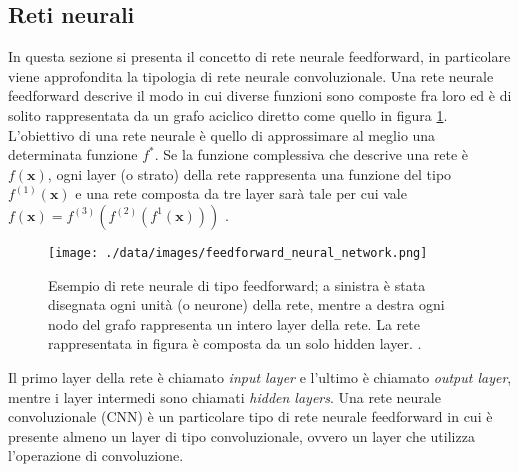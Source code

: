 \subsection{Reti neurali}
In questa sezione si presenta il concetto di rete neurale feedforward, in particolare viene approfondita la tipologia di rete neurale convoluzionale. 
Una rete neurale feedforward descrive il modo in cui diverse funzioni sono composte fra loro ed è di solito rappresentata da un grafo aciclico diretto come quello in figura \ref{feedforward}. L'obiettivo di una rete neurale è quello di approssimare al meglio una determinata funzione $f^{*}$. Se la funzione complessiva che descrive una rete è $f(\pmb{x})$, ogni layer (o strato) della rete rappresenta una funzione del tipo $f^{(1)}(\pmb{x})$ e una rete composta da tre layer sarà tale per cui vale $f(\pmb{x})=f^{(3)}(f^{(2)}(f^{1}(\pmb{x})))$ \cite{goodfellow2016deep}.
\begin{figure}
	\centering
	\texttt{[image: ./data/images/feedforward\_neural\_network.png]}
	\caption{Esempio di rete neurale di tipo feedforward; a sinistra è stata disegnata ogni unità (o neurone) della rete, mentre a destra ogni nodo del grafo rappresenta un intero layer della rete. La rete rappresentata in figura è composta da un solo hidden layer.  \cite{goodfellow2016deep}.}
	\label{feedforward}
\end{figure}
Il primo layer della rete è chiamato \textit{input layer} e l'ultimo è chiamato \textit{output layer}, mentre i layer intermedi sono chiamati \textit{hidden layers}. 
Una rete neurale convoluzionale (CNN) è un particolare tipo di rete neurale feedforward in cui è presente  almeno un layer di tipo convoluzionale, ovvero un layer che utilizza l'operazione di convoluzione.

